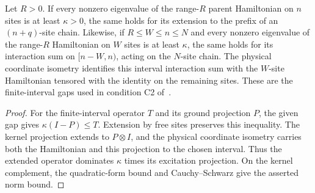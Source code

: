 \begin{lemma}
    \label{thm:open_interval_gap_transport}
    \leanok
    Let $R>0$. If every nonzero eigenvalue of the range-$R$ parent
    Hamiltonian on $n$ sites is at least $\kappa>0$, the same holds for its
    extension to the prefix of an $(n+q)$-site chain.
    Likewise, if $R\leq W\leq n\leq N$ and every nonzero eigenvalue of the
    range-$R$ Hamiltonian on $W$ sites is at least $\kappa$, the same holds
    for its interaction sum on $[n-W,n)$, acting on the $N$-site chain.
    The physical coordinate isometry identifies this interval interaction
    sum with the $W$-site Hamiltonian tensored with the identity on the
    remaining sites. These are the finite-interval gaps used in
    condition C2 of~\cite{Nachtergaele1996Spectral}.
\end{lemma}
\begin{proof}\leanok
    For the finite-interval operator $T$ and its ground projection $P$,
    the given gap gives $\kappa(I-P)\leq T$. Extension by free sites
    preserves this inequality. The kernel projection extends to
    $P\otimes I$, and the physical coordinate isometry carries both
    the Hamiltonian and this projection to the chosen interval.
    Thus the extended operator dominates $\kappa$ times its excitation
    projection. On the kernel complement, the quadratic-form bound and
    Cauchy--Schwarz give the asserted norm bound.
\end{proof}

